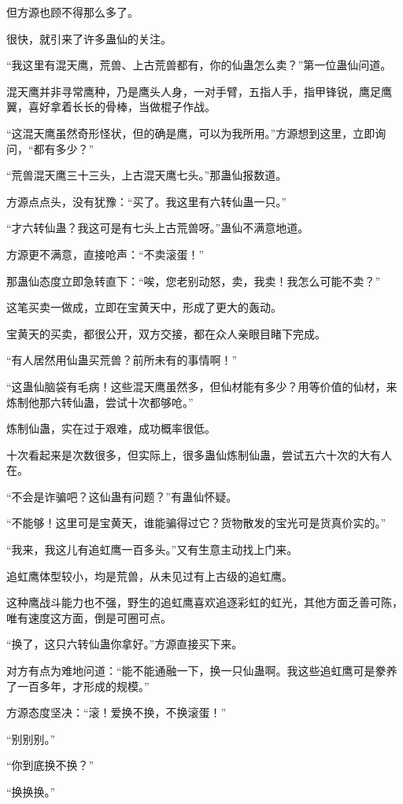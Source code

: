 \begin{this_body}
但方源也顾不得那么多了。

很快，就引来了许多蛊仙的关注。

“我这里有混天鹰，荒兽、上古荒兽都有，你的仙蛊怎么卖？”第一位蛊仙问道。

混天鹰并非寻常鹰种，乃是鹰头人身，一对手臂，五指人手，指甲锋锐，鹰足鹰翼，喜好拿着长长的骨棒，当做棍子作战。

“这混天鹰虽然奇形怪状，但的确是鹰，可以为我所用。”方源想到这里，立即询问，“都有多少？”

“荒兽混天鹰三十三头，上古混天鹰七头。”那蛊仙报数道。

方源点点头，没有犹豫：“买了。我这里有六转仙蛊一只。”

“才六转仙蛊？我这可是有七头上古荒兽呀。”蛊仙不满意地道。

方源更不满意，直接呛声：“不卖滚蛋！”

那蛊仙态度立即急转直下：“唉，您老别动怒，卖，我卖！我怎么可能不卖？”

这笔买卖一做成，立即在宝黄天中，形成了更大的轰动。

宝黄天的买卖，都很公开，双方交接，都在众人亲眼目睹下完成。

“有人居然用仙蛊买荒兽？前所未有的事情啊！”

“这蛊仙脑袋有毛病！这些混天鹰虽然多，但仙材能有多少？用等价值的仙材，来炼制他那六转仙蛊，尝试十次都够呛。”

炼制仙蛊，实在过于艰难，成功概率很低。

十次看起来是次数很多，但实际上，很多蛊仙炼制仙蛊，尝试五六十次的大有人在。

“不会是诈骗吧？这仙蛊有问题？”有蛊仙怀疑。

“不能够！这里可是宝黄天，谁能骗得过它？货物散发的宝光可是货真价实的。”

“我来，我这儿有追虹鹰一百多头。”又有生意主动找上门来。

追虹鹰体型较小，均是荒兽，从未见过有上古级的追虹鹰。

这种鹰战斗能力也不强，野生的追虹鹰喜欢追逐彩虹的虹光，其他方面乏善可陈，唯有速度这方面，倒是可圈可点。

“换了，这只六转仙蛊你拿好。”方源直接买下来。

对方有点为难地问道：“能不能通融一下，换一只仙蛊啊。我这些追虹鹰可是豢养了一百多年，才形成的规模。”

方源态度坚决：“滚！爱换不换，不换滚蛋！”

“别别别。”

“你到底换不换？”

“换换换。”


\end{this_body}
